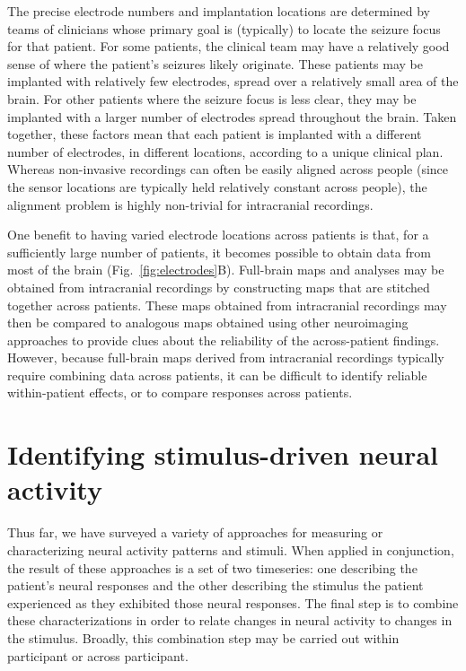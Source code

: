 \documentclass[runningheads]{llncs}
\begin{document}
The precise electrode numbers and implantation locations are
determined by teams of clinicians whose primary goal is (typically) to
locate the seizure focus for that patient.  For some patients, the
clinical team may have a relatively good sense of where the patient's
seizures likely originate.  These patients may be implanted with relatively few
electrodes, spread over a relatively small area of the brain.  For
other patients where the seizure focus is less clear, they may be
implanted with a larger number of electrodes spread throughout the
brain.  Taken together, these factors mean that each patient is
implanted with a different number of electrodes, in different
locations, according to a unique clinical plan.  Whereas non-invasive
recordings can often be easily aligned across people (since the
sensor locations are typically held relatively constant across
people), the alignment problem is highly non-trivial for intracranial
recordings.

One benefit to having varied electrode locations across patients is
that, for a sufficiently large number of patients, it becomes possible
to obtain data from most of the brain (Fig.~\ref{fig:electrodes}B).
Full-brain maps and analyses may be obtained from intracranial
recordings by constructing maps that are stitched together across
patients.  These maps obtained from intracranial recordings may then
be compared to analogous maps obtained using other neuroimaging
approaches to provide clues about the reliability of the
across-patient findings.  However, because full-brain maps derived
from intracranial recordings typically require combining data across
patients, it can be difficult to identify reliable within-patient
effects, or to compare responses across patients.



\section{Identifying stimulus-driven neural activity \label{sec:linking}}
Thus far, we have surveyed a variety of approaches for measuring or
characterizing neural activity patterns and stimuli.  When applied in
conjunction, the result of these approaches is a set of two
timeseries: one describing the patient's neural responses and the other describing
the stimulus the patient experienced as they exhibited those neural
responses.  The final step is to combine these characterizations in
order to relate changes in neural activity to changes in the
stimulus.  Broadly, this combination step may be carried out
within participant or across participant.
\end{document}
